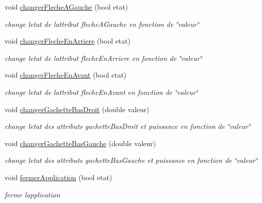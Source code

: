 \begin{DoxyCompactItemize}
void \hyperlink{class_manette_ad4a00c510c7f6beb882d1e1d323346ae}{changer\+Fleche\+A\+Gauche} (bool etat)
\begin{DoxyCompactList}\small\item\em change l\textquotesingle{}etat de l\textquotesingle{}attribut fleche\+A\+Gauche en fonction de \char`\"{}valeur\char`\"{} \end{DoxyCompactList}\item 
void \hyperlink{class_manette_a6e83727ee7bf7b3276b86d08b1c8d4d5}{changer\+Fleche\+En\+Arriere} (bool etat)
\begin{DoxyCompactList}\small\item\em change l\textquotesingle{}etat de l\textquotesingle{}attribut fleche\+En\+Arriere en fonction de \char`\"{}valeur\char`\"{} \end{DoxyCompactList}\item 
void \hyperlink{class_manette_aec3aca0f38959daec78db1f97f79c2d6}{changer\+Fleche\+En\+Avant} (bool etat)
\begin{DoxyCompactList}\small\item\em change l\textquotesingle{}etat de l\textquotesingle{}attribut fleche\+En\+Avant en fonction de \char`\"{}valeur\char`\"{} \end{DoxyCompactList}\item 
void \hyperlink{class_manette_aa3540dc97fd85153baf80b9e06e8565f}{changer\+Gachette\+Bas\+Droit} (double valeur)
\begin{DoxyCompactList}\small\item\em change l\textquotesingle{}etat des attributs gachette\+Bas\+Droit et puissance en fonction de \char`\"{}valeur\char`\"{} \end{DoxyCompactList}\item 
void \hyperlink{class_manette_a858088ed0eb2259fcb2f3df390e950c9}{changer\+Gachette\+Bas\+Gauche} (double valeur)
\begin{DoxyCompactList}\small\item\em change l\textquotesingle{}etat des attributs gachette\+Bas\+Gauche et puissance en fonction de \char`\"{}valeur\char`\"{} \end{DoxyCompactList}\item 
void \hyperlink{class_manette_a7345a7c5bfdc566119f7db7358584b6c}{fermer\+Application} (bool etat)
\begin{DoxyCompactList}\small\item\em ferme l\textquotesingle{}application \end{DoxyCompactList}\end{DoxyCompactItemize}
